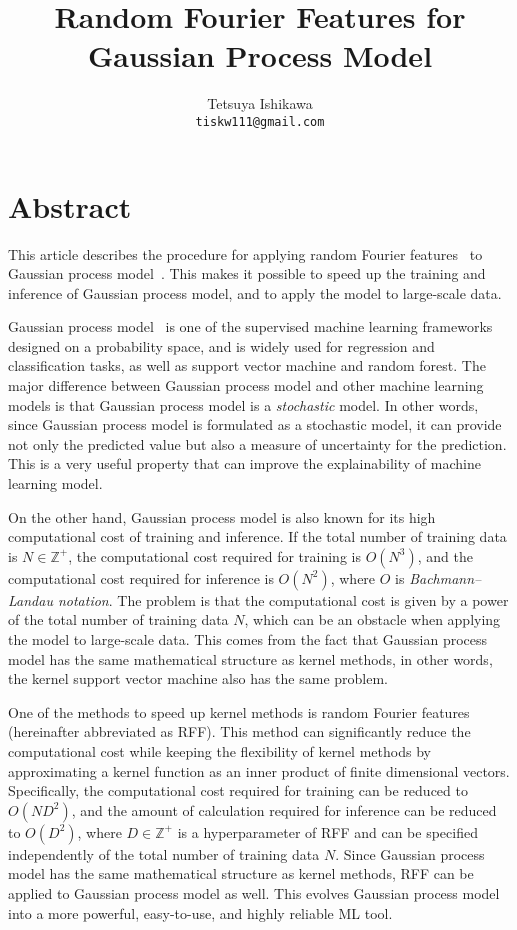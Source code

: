 \documentclass[twocolumn,a4paper,10pt]{article}
\begin{document}
\title{Random Fourier Features for Gaussian Process Model}
\author{Tetsuya Ishikawa \\ \normalsize\texttt{tiskw111@gmail.com}}
\maketitle
\thispagestyle{fancy}

\section*{Abstract}\titlebar

This article describes the procedure for applying random Fourier features~\cite{Rahimi2007}
to Gaussian process model~\cite{Rasmussen2006}. This makes it possible to speed up the training
and inference of Gaussian process model, and to apply the model to large-scale data.

Gaussian process model~\cite{Rasmussen2006} is one of the supervised machine learning frameworks
designed on a probability space, and is widely used for regression and classification tasks, as
well as support vector machine and random forest. The major difference between Gaussian process
model and other machine learning models is that Gaussian process model is a \textit{stochastic}
model. In other words, since Gaussian process model is formulated as a stochastic model,
it can provide not only the predicted value but also a measure of uncertainty for the prediction.
This is a very useful property that can improve the explainability of machine learning model.

On the other hand, Gaussian process model is also known for its high computational cost of training
and inference. If the total number of training data is $N \in \mathbb{Z}^{+}$, the computational
cost required for training is $O(N^3)$, and the computational cost required for inference is
$O(N^2)$, where $O$ is \textit{Bachmann–Landau notation}. The problem is that the computational cost
is given by a power of the total number of training data $N$, which can be an obstacle when applying
the model to large-scale data. This comes from the fact that Gaussian process model has the same
mathematical structure as kernel methods, in other words, the kernel support vector machine also
has the same problem.

One of the methods to speed up kernel methods is random Fourier features~\cite{Rahimi2007}
(hereinafter abbreviated as RFF). This method can significantly reduce the computational cost while
keeping the flexibility of kernel methods by approximating a kernel function as an inner product
of finite dimensional vectors. Specifically, the computational cost required for training can be
reduced to $O(N D^2)$, and the amount of calculation required for inference can be reduced to
$O(D^2)$, where $D \in \mathbb{Z}^{+}$ is a hyperparameter of RFF and can be specified
independently of the total number of training data $N$. Since Gaussian process model has the same
mathematical structure as kernel methods, RFF can be applied to Gaussian process model as well.
This evolves Gaussian process model into a more powerful, easy-to-use, and highly reliable ML tool.
\end{document}
